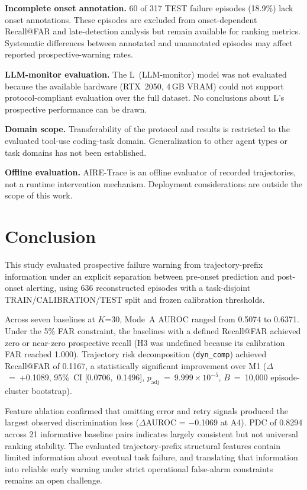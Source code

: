 \documentclass[conference,letterpaper]{IEEEtran}
\begin{document}
\textbf{Incomplete onset annotation.} 60 of 317 TEST failure episodes
(18.9\%) lack onset annotations. These episodes are excluded from
onset-dependent Recall@FAR and late-detection analysis but remain
available for ranking metrics. Systematic differences between annotated
and unannotated episodes may affect reported prospective-warning rates.

\textbf{LLM-monitor evaluation.} The L~(LLM-monitor) model was not
evaluated because the available hardware (RTX~2050, 4\,GB VRAM) could
not support protocol-compliant evaluation over the full dataset. No
conclusions about L's prospective performance can be drawn.

\textbf{Domain scope.} Transferability of the protocol and results is
restricted to the evaluated tool-use coding-task domain. Generalization
to other agent types or task domains has not been established.

\textbf{Offline evaluation.} AIRE-Trace is an offline evaluator of
recorded trajectories, not a runtime intervention mechanism. Deployment
considerations are outside the scope of this work.

\section{Conclusion}

This study evaluated prospective failure warning from trajectory-prefix
information under an explicit separation between pre-onset prediction
and post-onset alerting, using 636 reconstructed episodes with a
task-disjoint TRAIN/CALIBRATION/TEST split and frozen calibration
thresholds.

Across seven baselines at $K$=30, Mode~A AUROC ranged from 0.5074 to
0.6371. Under the 5\% FAR constraint, the baselines with a defined
Recall@FAR achieved zero or near-zero prospective recall (H3 was
undefined because its calibration FAR reached 1.000). Trajectory
risk decomposition (\texttt{dyn\_comp}) achieved Recall@FAR of 0.1167,
a statistically significant improvement over M1
($\Delta$~=~+0.1089, 95\%~CI [0.0706,~0.1496],
$p_{\mathrm{adj}}$~=~$9.999 \times 10^{-5}$, $B$~=~10{,}000
episode-cluster bootstrap).

Feature ablation confirmed that omitting error and retry signals
produced the largest observed discrimination loss ($\Delta$AUROC = $-$0.1069
at A4). PDC of
0.8294 across 21 informative baseline pairs indicates largely consistent
but not universal ranking stability. The evaluated trajectory-prefix
structural features contain limited information about eventual task
failure, and translating that information into reliable early warning
under strict operational false-alarm constraints remains an open
challenge.
\end{document}
